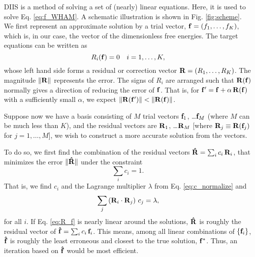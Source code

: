 \documentclass[reprint,superscriptaddress]{revtex4-1}
\begin{document}
DIIS is a method of solving a set of
(nearly) linear equations\cite{
pulay1980, *pulay1982, *hamilton1986,
kovalenko1999, howard2011}.
%
Here, it is used
to solve Eq. \eqref{eq:f_WHAM}.
%
A schematic illustration
is shown in Fig. \ref{fig:scheme}.
%
We first represent an approximate solution
by a trial vector,
$\mathbf{f} = (f_1, \dots, f_K)$,
which is, in our case, the vector of
the dimensionless free energies.
%
The target equations can be written as
%
\begin{equation}
  R_i(\mathbf{f}) = 0  \quad i = 1, \ldots, K,
  \label{eq:R_f}
\end{equation}
%
whose left hand side forms
a residual or correction vector
$\mathbf{R} = (R_1, \dots, R_K)$.
%
The magnitude
$\| \mathbf{R} \|$
represents the error.
%
The signs of $R_i$ are arranged such that
$\mathbf{R}(\mathbf{f})$
normally gives a direction
of reducing the error of $\mathbf{f}$.
%
That is,
for $\mathbf{f}' = \mathbf{f} + \alpha \, \mathbf{R}(\mathbf{f})$
with a sufficiently small $\alpha$,
we expect
%
$\| \mathbf{R}(\mathbf{f}') \| < \| \mathbf{R}(\mathbf{f}) \|$.



Suppose now we have a basis consisting of $M$ trial vectors
$\mathbf{f}_1$, \dots $\mathbf{f}_M$
(where $M$ can be much less than $K$),
%
and the residual vectors are
$\mathbf{R}_1$, \dots $\mathbf{R}_M$
[where $\mathbf{R}_j \equiv \mathbf{R}(\mathbf{f}_j)$
for $j = 1, \dots, M$],
%
we wish to construct a more accurate solution
from the vectors.



To do so, we first find the combination of the residual vectors
$\mathbf{\hat R} = \sum_i c_i \, \mathbf{R}_i$,
that minimizes the error
$\| \mathbf{\hat R} \|$
under the constraint
\begin{equation}
  \sum_i c_i = 1.
  \label{eq:c_normalize}
\end{equation}
%
That is,
we find $c_i$ and the Lagrange multiplier $\lambda$
from Eq. \eqref{eq:c_normalize} and
\begin{equation*}
  \sum_j \left( \mathbf{R}_i \cdot \mathbf{R}_j \right) \, c_j = \lambda,
\end{equation*}
for all $i$.
%
If Eq. \eqref{eq:R_f} is nearly linear
around the solutions,
%
$\mathbf{\hat R}$
is roughly the residual vector of
$\mathbf{\hat f} = \sum_i c_i \, \mathbf{f}_i$.
%
This means,
among all linear combinations of
$\{ \mathbf{f}_i \}$,
$\mathbf{\hat f}$
is roughly the least erroneous
and closest to the true solution,
$\mathbf{f}^*$.
%
Thus,
an iteration based on
$\mathbf{\hat f}$
would be most efficient.
\end{document}
